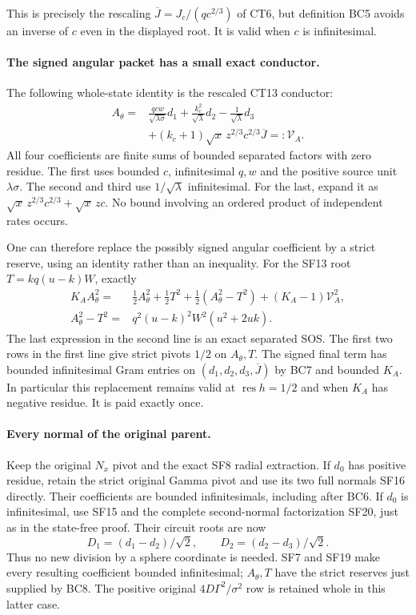 This is precisely the rescaling
$\overline J=J_c/(q c^{2/3})$ of CT6, but definition BC5 avoids
an inverse of $c$ even in the displayed root. It is valid when
$c$ is infinitesimal.

\paragraph{The signed angular packet has a small exact conductor.}
The following whole-state identity is the rescaled CT13 conductor:
\[
\begin{split}
 A_\theta={}&
 \frac{qcw}{\sqrt{\lambda\sigma}}d_1
 +\frac{k_c^2}{\sqrt\lambda}d_2
 -\frac1{\sqrt\lambda}d_3\\
 &+(k_c+1)\sqrt x\,z^{2/3}c^{2/3}\overline J
 =:\mathcal V_A.
\end{split}\tag{BC7}
\]
All four coefficients are finite sums of bounded separated factors
with zero residue. The first uses bounded $c$, infinitesimal $q,w$
and the positive source unit $\lambda\sigma$. The second and third
use $1/\sqrt\lambda$ infinitesimal. For the last, expand it as
$\sqrt x\,z^{2/3}c^{2/3}+\sqrt x\,zc$.
No bound involving an ordered product of independent rates occurs.

One can therefore replace the possibly signed angular coefficient
by a strict reserve, using an identity rather than an inequality.
For the SF13 root $T=kq(u-k)W$, exactly
\[
\begin{split}
 K_AA_\theta^2={}&\tfrac12 A_\theta^2+\tfrac12 T^2
       +\tfrac12(A_\theta^2-T^2)
       +(K_A-1)\mathcal V_A^2,\\
 A_\theta^2-T^2={}&q^2(u-k)^2W^2(u^2+2uk).
\end{split}\tag{BC8}
\]
The last expression in the second line is an exact separated SOS.
The first two rows in the first line give strict pivots $1/2$ on
$A_\theta,T$. The signed final term has bounded infinitesimal Gram
entries on $(d_1,d_2,d_3,\overline J)$ by BC7 and bounded $K_A$.
In particular this replacement remains valid at $\operatorname{res}h=1/2$
and when $K_A$ has negative residue. It is paid exactly once.

\paragraph{Every normal of the original parent.}
Keep the original $N_x$ pivot and the exact SF8 radial extraction.
If $d_0$ has positive residue, retain the strict original Gamma
pivot and use its two full normals SF16 directly. Their coefficients
are bounded infinitesimals, including after BC6. If $d_0$ is
infinitesimal, use SF15 and the complete second-normal factorization
SF20, just as in the state-free proof. Their circuit roots are now
\[
 D_1=(d_1-d_2)/\sqrt2,\qquad
 D_2=(d_2-d_3)/\sqrt2.
 \tag{BC9}
\]
Thus no new division by a sphere coordinate is needed. SF7 and SF19
make every resulting coefficient bounded infinitesimal; $A_\theta,T$
have the strict reserves just supplied by BC8. The positive original
$4D\Gamma^2/\sigma^2$ row is retained whole in this latter case.


